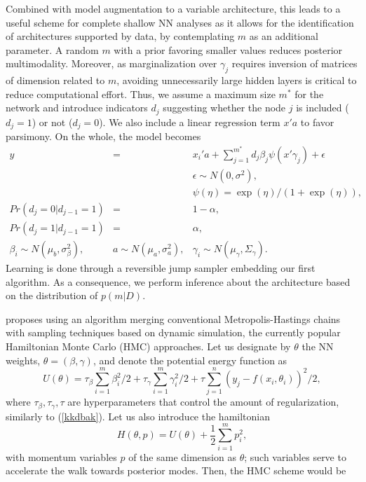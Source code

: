 Combined with model augmentation to a variable architecture,
 this leads to a useful scheme
for complete shallow NN analyses as it allows for 
the identification of
architectures supported by data, by  
contemplating $m$ as an additional parameter.
A random $m$ with a prior 
favoring smaller values reduces posterior multimodality.
Moreover, as marginalization over $\gamma_ j$ requires inversion of matrices
of dimension related to $m$, 
avoiding unnecessarily large
hidden layers is critical to
reduce computational effort.
 Thus, we assume 
a maximum size $m^*$ for the network and introduce 
indicators  $d_j$ suggesting whether the node
$j$ is included ($d_j=1$) or not ($d_j=0$). 
We also 
include a linear regression term $x'a$
to favor parsimony. On the whole, the model
becomes 
\begin{eqnarray*}
  y          & = & x_i'a + \sum_{j=1}^{m^*} d_j\beta_j \psi(x '\gamma_j) +
                    \epsilon \\ %
                    & & \epsilon \sim N(0,\sigma^2),\nonumber \\
                    & &    \psi(\eta) = \exp(\eta)/(1+\exp(\eta)),
                        \nonumber \\
  Pr(d_j=0|d_{j-1}=1)   & = & 1-\alpha, \nonumber\\
  Pr(d_j=1|d_{j-1}=1)   & = & \alpha, \nonumber\\
  \beta_i    \sim  N(\mu_b,\sigma_\beta^2),& 
  a     \sim  N(\mu_a,\sigma_a^2), &   \gamma_i   \sim  N(\mu_\gamma,\Sigma_\gamma).
                \label{eq:model-var}
\end{eqnarray*}
Learning is done through a reversible jump sampler
\citep{green} embedding our first algorithm.
As a consequence, we perform inference
about the architecture based on the distribution of 
 $p(m|D)$. 

 \cite{neal2012bayesian} proposes using an 
algorithm merging conventional Metropolis-Hastings chains with sampling
techniques based on dynamic simulation, the currently popular
Hamiltonian Monte Carlo (HMC) approaches.
Let us designate by $\theta$ the NN 
weights, $\theta = (\beta, \gamma)$, and denote the potential energy function as
$$
U(\theta) = \tau_{\beta}\sum_{i=1}^m \beta_i^2/2 + \tau_{\gamma} \sum_{i=1}^m \gamma_i^2/2 + \tau \sum_{j=1}^n (y_j - f(x_i, \theta_i))^2/2,
$$
where $\tau_{\beta}, \tau_{\gamma}, \tau$ are hyperparameters that control the amount of regularization, similarly to (\ref{kkdbak}). 
Let us also introduce the hamiltonian 
$$
H(\theta, p) = U(\theta) + \frac{1}{2} \sum_{i=1}^m p_i^2,
$$
with momentum variables $p$ of the same dimension as $\theta$; such 
 variables serve to accelerate the walk towards posterior modes. Then, the HMC scheme would be

